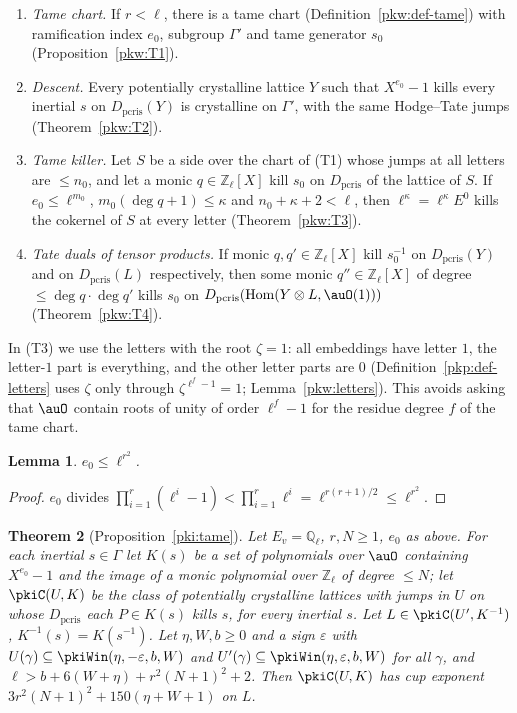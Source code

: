 \documentclass[10pt]{amsart}
\newtheorem{theorem}{Theorem}[section]
\newtheorem{lemma}[theorem]{Lemma}
\theoremstyle{definition}
\theoremstyle{remark}
\newcommand{\Z}{\mathbb Z}
\newcommand{\Q}{\mathbb Q}
\begin{document}
\begin{enumerate}
\item[(T1)] \emph{Tame chart.} If $r<\ell$, there is a tame chart (Definition~\ref{pkw:def-tame}) with
ramification index $e_0$, subgroup $\Gamma'$ and tame generator $s_0$ (Proposition~\ref{pkw:T1}).
\item[(T2)] \emph{Descent.} Every potentially crystalline lattice $Y$ such that $X^{e_0}-1$ kills every
inertial $s$ on $D_{\mathrm{pcris}}(Y)$ is crystalline on $\Gamma'$, with the same Hodge--Tate jumps
(Theorem~\ref{pkw:T2}).
\item[(T3)] \emph{Tame killer.} Let $S$ be a side over the chart of (T1) whose jumps at all letters are
$\le n_0$, and let a monic $q\in\Z_\ell[X]$ kill $s_0$ on $D_{\mathrm{pcris}}$ of the lattice of $S$. If
$e_0\le\ell^{m_0}$, $m_0(\deg q+1)\le\kappa$ and $n_0+\kappa+2<\ell$, then $\ell^\kappa=\ell^\kappa E^0$
kills the cokernel of $S$ at every letter (Theorem~\ref{pkw:T3}).
\item[(T4)] \emph{Tate duals of tensor products.} If monic $q,q'\in\Z_\ell[X]$ kill $s_0^{-1}$ on
$D_{\mathrm{pcris}}(Y)$ and on $D_{\mathrm{pcris}}(L)$ respectively, then some monic $q''\in\Z_\ell[X]$
of degree $\le\deg q\cdot\deg q'$ kills $s_0$ on
$D_{\mathrm{pcris}}(\operatorname{Hom}(Y\otimes L,\auO(1)))$ (Theorem~\ref{pkw:T4}).
\end{enumerate}

In (T3) we use the letters with the root $\zeta=1$: all embeddings have letter $1$, the letter-$1$ part
is everything, and the other letter parts are $0$ (Definition~\ref{pkp:def-letters} uses $\zeta$ only
through $\zeta^{\ell^f-1}=1$; Lemma~\ref{pkw:letters}). This avoids asking that $\auO$ contain roots of
unity of order $\ell^f-1$ for the residue degree $f$ of the tame chart.

\begin{lemma}\label{pkc:lcm}
$e_0\le\ell^{r^2}$.
\end{lemma}

\begin{proof}
$e_0$ divides $\prod_{i=1}^r(\ell^i-1)<\prod_{i=1}^r\ell^i=\ell^{r(r+1)/2}\le\ell^{r^2}$.
\end{proof}

\begin{theorem}[Proposition~\ref{pki:tame}]\label{pkc:tame}
Let $E_v=\Q_\ell$, $r,N\ge1$, $e_0$ as above. For each inertial $s\in\Gamma$ let $K(s)$ be a set of
polynomials over $\auO$ containing $X^{e_0}-1$ and the image of a monic polynomial over $\Z_\ell$ of
degree $\le N$; let $\pkiC(U,K)$ be the class of potentially crystalline lattices with jumps in $U$ on
whose $D_{\mathrm{pcris}}$ each $P\in K(s)$ kills $s$, for every inertial $s$. Let $L\in\pkiC(U',K^{-1})$,
$K^{-1}(s)=K(s^{-1})$. Let $\eta,W,b\ge0$ and a sign $\varepsilon$ with
$U(\gamma)\subseteq\pkiWin(\eta,-\varepsilon,b,W)$ and $U'(\gamma)\subseteq\pkiWin(\eta,\varepsilon,b,W)$
for all $\gamma$, and $\ell>b+6(W+\eta)+r^2(N+1)^2+2$. Then $\pkiC(U,K)$ has cup exponent
$3r^2(N+1)^2+150(\eta+W+1)$ on $L$.
\end{theorem}
\end{document}
